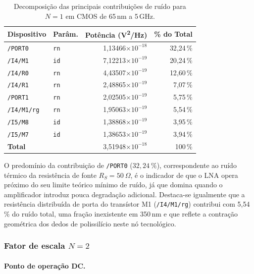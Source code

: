 \begin{table}[H]
\centering
\caption{Decomposição das principais contribuições de ruído para $N=1$ em CMOS de 65\,nm a 5\,GHz.}
\label{tab:noise65_N1}
\begin{tabular}{llrr}
\hline
\textbf{Dispositivo} & \textbf{Parâm.} & \textbf{Potência (V\textsuperscript{2}/Hz)} & \textbf{\% do Total} \\
\hline
\texttt{/PORT0}    & \texttt{rn} & 1{,}13466$\times 10^{-18}$ & 32{,}24\,\% \\
\texttt{/I4/M1}    & \texttt{id} & 7{,}12213$\times 10^{-19}$ & 20{,}24\,\% \\
\texttt{/I4/R0}    & \texttt{rn} & 4{,}43507$\times 10^{-19}$ & 12{,}60\,\% \\
\texttt{/I4/R1}    & \texttt{rn} & 2{,}48865$\times 10^{-19}$ & 7{,}07\,\%  \\
\texttt{/PORT1}    & \texttt{rn} & 2{,}02505$\times 10^{-19}$ & 5{,}75\,\%  \\
\texttt{/I4/M1/rg} & \texttt{rn} & 1{,}95063$\times 10^{-19}$ & 5{,}54\,\%  \\
\texttt{/I5/M8}    & \texttt{id} & 1{,}38868$\times 10^{-19}$ & 3{,}95\,\%  \\
\texttt{/I5/M7}    & \texttt{id} & 1{,}38653$\times 10^{-19}$ & 3{,}94\,\%  \\
\hline
\textbf{Total}     &             & 3{,}51948$\times 10^{-18}$ & 100\,\%      \\
\hline
\end{tabular}
\end{table}

O predomínio da contribuição de \texttt{/PORT0} ($32{,}24~\%$), correspondente ao ruído térmico da
resistência de fonte $R_S = 50~\Omega$, é o indicador de que o LNA opera próximo do seu
limite teórico mínimo de ruído, já que domina quando o amplificador introduz pouca
degradação adicional. Destaca-se igualmente que a resistência distribuída de porta do transístor M1
(\texttt{/I4/M1/rg}) contribui com 5{,}54\,\% do ruído total, uma fração inexistente em 350\,nm e
que reflete a contração geométrica dos dedos de polissilício neste nó tecnológico.

\subsubsection{Fator de escala \texorpdfstring{$N = 2$}{N=2}}

\paragraph{Ponto de operação DC.}

